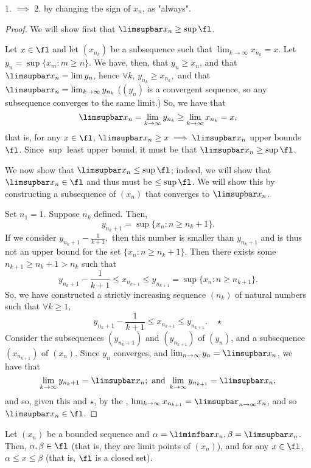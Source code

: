 \documentclass[12pt]{article}
\begin{document}
\begin{remark}
  1. $\implies$ 2. by changing the sign of $x_n$, as "always".
\end{remark}

\begin{proof}
  We will show first that $\limsupbar x_n \geq \sup \fl$.

  Let $x \in \fl$ and let $(x_{n_k})$ be a subsequence such that $\lim_{k\to\infty} x_{n_k} = x$. Let $y_n = \sup \{x_{m}: m \geq n\}$. We have, then, that $y_n \geq x_n$, and that $\limsupbar x_{n} = \lim y_n$, hence $\forall k$, $y_{n_k} \geq x_{n_k},$ and that $\limsupbar x_n = \lim_{k\to\infty} y_{n_k}$ ($(y_n)$ is a convergent sequence, so any subsequence converges to the same limit.) So, we have that $$\limsupbar x_n = \lim_{k\to\infty} y_{n_k} \geq \lim_{k\to\infty} x_{n_k} = x,$$ that is, for any $x \in \fl$, $\limsupbar x_n  \geq x \implies \limsupbar x_n$ upper bounds $\fl$. Since $\sup$ least upper bound, it must be that $\limsupbar x_n \geq \sup \fl$.

  We now show that $\limsupbar x_n \leq \sup \fl$; indeed, we will show that $\limsupbar x_n \in \fl$ and thus must be $\leq \sup \fl$. We will show this by constructing a subsequence of $(x_n)$ that converges to $\limsupbar x_n$.

  Set $n_1 = 1$. Suppose $n_k$ defined. Then, \[
  y_{n_k + 1} = \sup \{x_n : n \geq n_k + 1\}.  
  \]
  If we consider $y_{n_k + 1} - \frac{1}{k+1},$ then this number is smaller than $y_{n_k + 1}$ and is thus not an upper bound for the set $\{x_n :n \geq n_k + 1\}.$ Then there exists some $n_{k+1} \geq n_k + 1 > n_k$ such that \[
  y_{n_k + 1} - \frac{1}{k+1} \leq x_{n_{k+1}}   \leq y_{n_{k+1}} = \sup \{x_n : n \geq n_{k+1}\}.
  \]
  So, we have constructed a strictly increasing sequence $(n_k)$ of natural numbers such that $\forall k\geq 1,$ $$y_{n_k+1} - \frac{1}{k+1} \leq x_{n_{k+1}} \leq y_{n_{k+1}}. \quad \star$$ Consider the subsequences $(y_{n_k + 1})$ and $(y_{n_{k+1}})$ of $(y_n)$, and a subsequence $(x_{n_{k+1}})$ of $(x_n)$. Since $y_n$ converges, and $\lim_{n\to\infty} y_n = \limsupbar x_n$, we have that \[
    \lim_{k\to\infty} y_{n_k + 1} = \limsupbar x_n; \text{ and } \lim_{k\to\infty} y_{n_{k+1}} = \limsupbar x_n,
    \]
    and so, given this and $\star$, by the ,  $\lim_{k\to\infty} x_{n_{k+1}} = \limsupbar_{n\to\infty} x_n$, and so $\limsupbar x_n \in \fl$.
\end{proof}

\begin{corollary}
  Let $(x_n)$ be a bounded sequence and $\alpha = \liminfbar x_n, \beta = \limsupbar x_n$. Then, $\alpha, \beta \in \fl$ (that is, they are limit points of $(x_n)$), and for any $x \in \fl$, $\alpha \leq x \leq \beta$ (that is, $\fl$ is a closed set).
\end{corollary}
\end{document}
